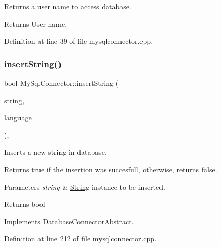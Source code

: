Returns a user name to access database. 

\begin{DoxyReturn}{Returns}
User name. 
\end{DoxyReturn}


Definition at line 39 of file mysqlconnector.\+cpp.

\mbox{\label{classMySqlConnector_a4608c0764241969454a55b42873cb86b}} 
\subsubsection{\texorpdfstring{insert\+String()}{insertString()}}
{\footnotesize\ttfamily bool My\+Sql\+Connector\+::insert\+String (\begin{DoxyParamCaption}\item[{const \mbox{\hyperlink{classString}{String}} \&}]{string,  }\item[{const Q\+String}]{language }\end{DoxyParamCaption})\hspace{0.3cm}{\ttfamily [override]}, {\ttfamily [virtual]}}



Inserts a new string in database. 

Returns true if the insertion was succesfull, otherwise, returns false. 
\begin{DoxyParams}{Parameters}
{\em string} & \mbox{\hyperlink{classString}{String}} instance to be inserted. \\
\hline
\end{DoxyParams}
\begin{DoxyReturn}{Returns}
bool 
\end{DoxyReturn}


Implements \mbox{\hyperlink{classDatabaseConnectorAbstract_ac7cc5cf2deace9652810001722758206}{Database\+Connector\+Abstract}}.



Definition at line 212 of file mysqlconnector.\+cpp.

\mbox{\label{classMySqlConnector_a77a5169dd8a515b613642c88dac9798b}} 
